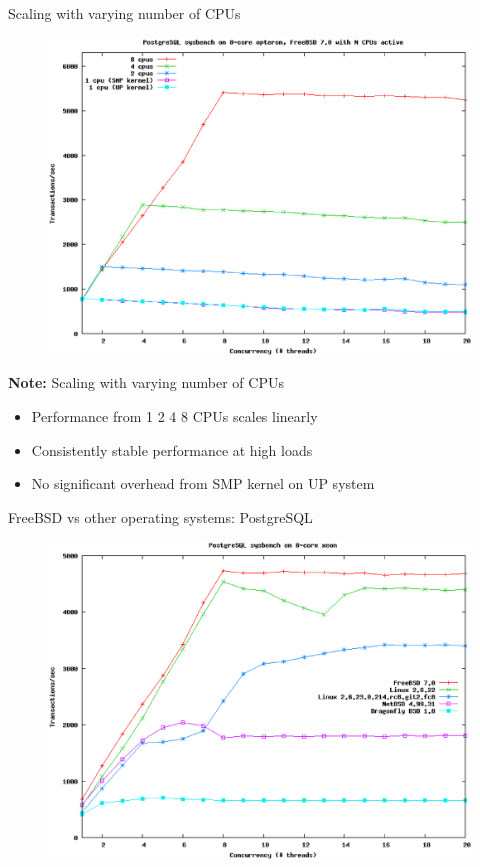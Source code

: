 \documentclass[xcolor=dvipsnames]{beamer}
\begin{document}
	\begin{frame}{\scriptsize{Scaling with varying number of CPUs}}
	\begin{figure}
	\centering 
		\includegraphics[scale=0.32]{graf01.eps} 
	\end{figure}	
	\end{frame}
	
	\begin{frame}{\scriptsize{\textbf{Note:} Scaling with varying number of CPUs}}
	\begin{itemize}
		\item Performance from 1  2  4  8 CPUs scales linearly
		\item Consistently stable performance at high loads
		\item No significant overhead from SMP kernel on UP system
	\end{itemize}
	\end{frame}
		
	\begin{frame}{\scriptsize{FreeBSD vs other operating systems: PostgreSQL}}
	\begin{figure}
	\centering 
		\includegraphics[scale=0.32]{graf02.eps} 
	\end{figure}
	\end{frame}
\end{document}
